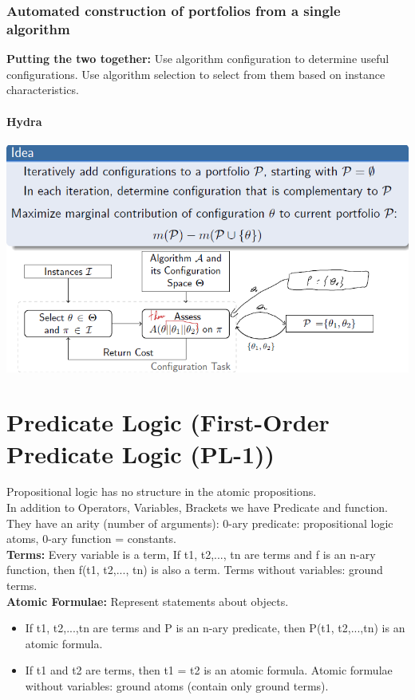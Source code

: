 \documentclass{article}
\begin{document}
\subsubsection{Automated construction of portfolios from a single algorithm}
\textbf{Putting the two together: }Use algorithm configuration to determine useful configurations. Use algorithm selection to select from them based on instance
characteristics.\\\\
\textbf{Hydra}\\\\
\includegraphics[scale=0.8]{42.png}

\section{Predicate Logic (First-Order Predicate Logic (PL-1))}
Propositional logic has no structure in the atomic propositions.\\
In addition to Operators, Variables, Brackets we have Predicate and function. They have an arity (number of arguments): 0-ary predicate: propositional logic atoms, 0-ary function = constants.\\ 
\textbf{Terms: }Every variable is a term, If t1, t2,..., tn are terms and f is an n-ary function, then f(t1, t2,..., tn) is also a term. Terms without variables: ground terms.\\
\textbf{Atomic Formulae: }Represent statements about objects.
\begin{itemize}
\item If t1, t2,...,tn are terms and P is an n-ary predicate, then P(t1, t2,...,tn) is an atomic formula.
\item If t1 and t2 are terms, then t1 = t2 is an atomic formula. Atomic formulae without variables: ground atoms (contain only ground terms). 
\end{itemize}
\end{document}
